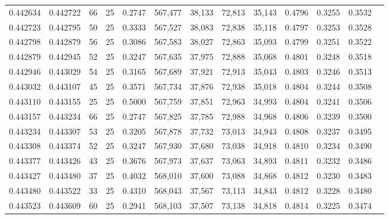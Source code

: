 \begin{tabular}{rrrrrrrrrrrrr}
0.442634 & 0.442722 &    66 &  25 &                                     0.2747 & 567,477 &  38,133 &  72,813 &  35,143 & 0.4796 & 0.3255 & 0.3532 \\
0.442723 & 0.442795 &    50 &  25 &                                     0.3333 & 567,527 &  38,083 &  72,838 &  35,118 & 0.4797 & 0.3253 & 0.3528 \\
0.442798 & 0.442879 &    56 &  25 &                                     0.3086 & 567,583 &  38,027 &  72,863 &  35,093 & 0.4799 & 0.3251 & 0.3522 \\
0.442879 & 0.442945 &    52 &  25 &                                     0.3247 & 567,635 &  37,975 &  72,888 &  35,068 & 0.4801 & 0.3248 & 0.3518 \\
0.442946 & 0.443029 &    54 &  25 &                                     0.3165 & 567,689 &  37,921 &  72,913 &  35,043 & 0.4803 & 0.3246 & 0.3513 \\
0.443032 & 0.443107 &    45 &  25 &                                     0.3571 & 567,734 &  37,876 &  72,938 &  35,018 & 0.4804 & 0.3244 & 0.3508 \\
0.443110 & 0.443155 &    25 &  25 &                                     0.5000 & 567,759 &  37,851 &  72,963 &  34,993 & 0.4804 & 0.3241 & 0.3506 \\
0.443157 & 0.443234 &    66 &  25 &                                     0.2747 & 567,825 &  37,785 &  72,988 &  34,968 & 0.4806 & 0.3239 & 0.3500 \\
0.443234 & 0.443307 &    53 &  25 &                                     0.3205 & 567,878 &  37,732 &  73,013 &  34,943 & 0.4808 & 0.3237 & 0.3495 \\
0.443308 & 0.443374 &    52 &  25 &                                     0.3247 & 567,930 &  37,680 &  73,038 &  34,918 & 0.4810 & 0.3234 & 0.3490 \\
0.443377 & 0.443426 &    43 &  25 &                                     0.3676 & 567,973 &  37,637 &  73,063 &  34,893 & 0.4811 & 0.3232 & 0.3486 \\
0.443427 & 0.443480 &    37 &  25 &                                     0.4032 & 568,010 &  37,600 &  73,088 &  34,868 & 0.4812 & 0.3230 & 0.3483 \\
0.443480 & 0.443522 &    33 &  25 &                                     0.4310 & 568,043 &  37,567 &  73,113 &  34,843 & 0.4812 & 0.3228 & 0.3480 \\
0.443523 & 0.443609 &    60 &  25 &                                     0.2941 & 568,103 &  37,507 &  73,138 &  34,818 & 0.4814 & 0.3225 & 0.3474 \\

\end{tabular}
